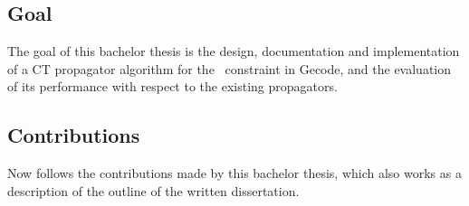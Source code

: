 \documentclass[a4paper,11pt]{article}
\newcommand{\Todo}[1]{{\color{blue}#1}}
\newcommand{\Table}{\Constraint{Table}~}
\newcommand{\CTpaper}[0]{DBLP:conf/cp/DemeulenaereHLP16}
\numberwithin{equation}{section}
\begin{document}

\subsection{Goal}
\label{intro:goal}
The goal of this bachelor thesis is the design, documentation and implementation
of a CT propagator algorithm for the \Table constraint in Gecode,
and the evaluation of its performance with respect to the existing propagators.

\subsection{Contributions}
\label{intro:contributions}


Now follows the contributions made by this bachelor thesis, which also works as a
description of the outline of the written dissertation.

\end{document}
